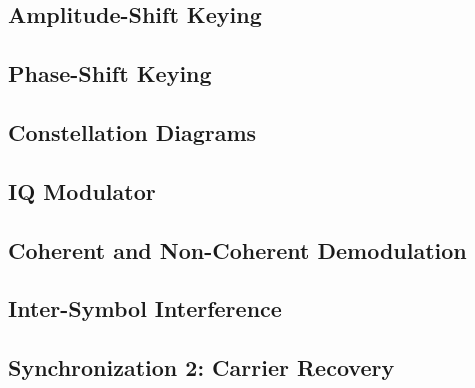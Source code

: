 \begin{refsection}
\subsection{Amplitude-Shift Keying}

\subsection{Phase-Shift Keying}

\subsection{Constellation Diagrams}




\subsection{IQ Modulator}


\subsection{Coherent and Non-Coherent Demodulation}

\subsection{Inter-Symbol Interference}

\subsection{Synchronization 2: Carrier Recovery}



{}
\printbibliography[heading=subbibliography]
\end{refsection}

